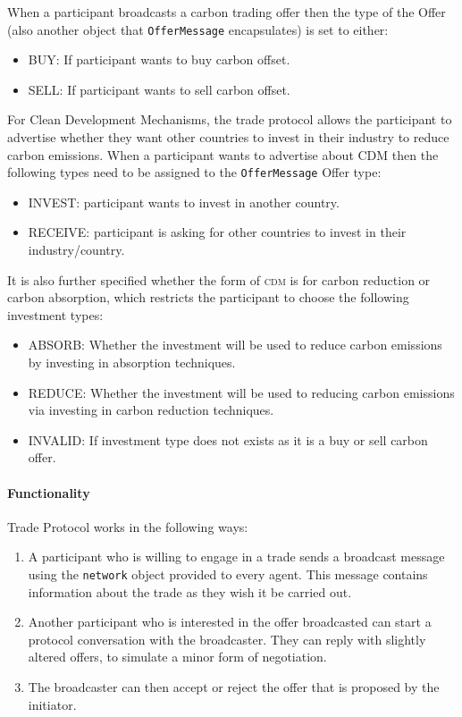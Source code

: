 When a participant broadcasts a carbon trading offer then the type of the Offer (also another 
object that \texttt{OfferMessage} encapsulates) is set to either:
 
\begin{itemize}
\item BUY: If participant wants to buy carbon offset.
\item SELL: If participant wants to sell carbon offset.
\end{itemize}

For Clean Development Mechanisms, the trade protocol allows the participant to advertise whether they want other countries to invest in their industry to reduce carbon emissions. When a participant wants to advertise about CDM then the following types need to be assigned to the \texttt{OfferMessage} Offer type:

\begin{itemize}
\item INVEST: participant wants to invest in another country.
\item RECEIVE: participant is asking for other countries to invest in their industry/country.
\end{itemize}

It is also further specified whether the form of \textsc{cdm} is for carbon reduction or carbon absorption, which restricts the participant to choose the following investment types:

\begin{itemize}
\item ABSORB: Whether the investment will be used to reduce carbon emissions by investing in absorption techniques.
\item REDUCE: Whether the investment will be used to reducing carbon emissions via investing in carbon reduction techniques.
\item INVALID: If investment type does not exists as it is a buy or sell carbon offer.
\end{itemize}

\paragraph{Functionality}

Trade Protocol works in the following ways:

\begin{enumerate}
\item A participant who is willing to engage in a trade sends a broadcast message using the \texttt{network} object provided to every agent. This message contains information about the trade as they wish it be carried out.
\item Another participant who is interested in the offer broadcasted can start a protocol conversation with the broadcaster. They can reply with slightly altered offers, to simulate a minor form of negotiation.
\item The broadcaster can then accept or reject the offer that is proposed by the initiator.
\end{enumerate}

